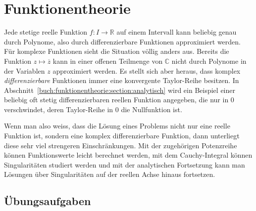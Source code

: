 %
%
%
\chapter{Funktionentheorie
\label{buch:chapter:funktionentheorie}}
Jede stetige reelle Funktion $f\colon I\to\mathbb{R}$ auf einem
Intervall kann beliebig genau durch Polynome, also durch
differenzierbare Funktionen approximiert werden.
Für komplexe Funktionen sieht die Situation völlig anders aus.
Bereits die Funktion $z\mapsto \overline{z}$ kann in einer offenen
Teilmenge von $\mathbb{C}$ nicht durch Polynome in der Variablen $z$
approximiert werden.
Es stellt sich aber heraus, dass  komplex {\em differenzierbare} Funktionen
immer eine konvergente Taylor-Reihe besitzen.
In Abschnitt~\ref{buch:funktionentheorie:section:analytisch} wird
ein Beispiel einer beliebig oft stetig differenzierbaren reellen
Funktion angegeben, die nur in $0$ verschwindet, deren Taylor-Reihe
in $0$ die Nullfunktion ist.

Wenn man also weiss, dass die Lösung eines Problems nicht nur eine
reelle Funktion ist, sondern eine komplex differenzierbare Funktion,
dann unterliegt diese sehr viel strengeren Einschränkungen.
Mit der zugehörigen Potenzreihe können Funktionswerte leicht berechnet
werden, mit dem Cauchy-Integral können Singularitäten studiert werden
und mit der analytischen Fortsetzung kann man Lösungen über Singularitäten
auf der reellen Achse hinaus fortsetzen.







\section*{Übungsaufgaben}
\begin{uebungsaufgaben}
\end{uebungsaufgaben}

